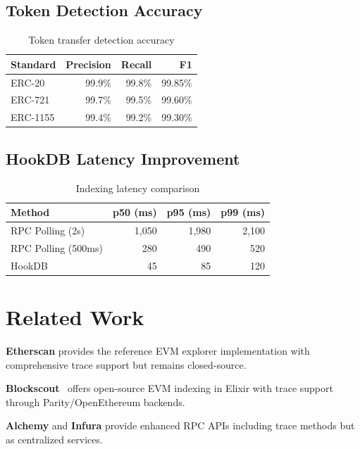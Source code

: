 \documentclass[11pt,twocolumn]{article}
\begin{document}
\subsection{Token Detection Accuracy}

\begin{table}[h]
\centering
\caption{Token transfer detection accuracy}
\begin{tabular}{@{}lrrr@{}}
\toprule
Standard & Precision & Recall & F1 \\
\midrule
ERC-20 & 99.9\% & 99.8\% & 99.85\% \\
ERC-721 & 99.7\% & 99.5\% & 99.60\% \\
ERC-1155 & 99.4\% & 99.2\% & 99.30\% \\
\bottomrule
\end{tabular}
\label{tab:token-accuracy}
\end{table}

\subsection{HookDB Latency Improvement}

\begin{table}[h]
\centering
\caption{Indexing latency comparison}
\begin{tabular}{@{}lrrr@{}}
\toprule
Method & p50 (ms) & p95 (ms) & p99 (ms) \\
\midrule
RPC Polling (2s) & 1,050 & 1,980 & 2,100 \\
RPC Polling (500ms) & 280 & 490 & 520 \\
HookDB & 45 & 85 & 120 \\
\bottomrule
\end{tabular}
\label{tab:hookdb-latency}
\end{table}

\section{Related Work}

\textbf{Etherscan} provides the reference EVM explorer implementation with comprehensive trace support but remains closed-source.

\textbf{Blockscout}~\cite{blockscout} offers open-source EVM indexing in Elixir with trace support through Parity/OpenEthereum backends.

\textbf{Alchemy} and \textbf{Infura} provide enhanced RPC APIs including trace methods but as centralized services.
\end{document}
